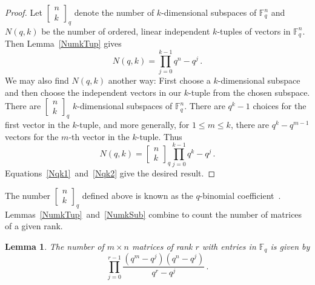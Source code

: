 \documentclass[3p,times]{elsarticle}
\newtheorem{lemma}[theorem]{Lemma}
\theoremstyle{remark}
\newcommand{\qbin}[2]{\begin{bmatrix}{#1}\\ {#2}\end{bmatrix}_q}
\newcommand{\Fq}{\mathbb{F}_q}
\newcommand\Fqn[1]{\mathbb{F}_q^{#1}}
\begin{document}
\begin{proof}
  Let $\left[\begin{smallmatrix}n\\k\end{smallmatrix}\right]_q$ denote the number of $k$-dimensional subspaces of $\Fqn{n}$
  and $N(q,k)$ be the number of ordered, linear independent $k$-tuples of
  vectors in $\Fqn{n}$.  Then Lemma~\ref{NumkTup} gives
  \begin{equation}
    \label{Nqk1}
    N(q,k) = \prod_{j=0}^{k-1} q^n-q^j \, .
  \end{equation}
  We may also find $N(q,k)$ another way: First choose a $k$-dimensional
  subspace and then choose the independent vectors in our $k$-tuple from the
  chosen subspace.  There are
  $\left[\begin{smallmatrix}n\\k\end{smallmatrix}\right]_q$ $k$-dimensional
  subspaces of $\Fqn{n}$.  There are $q^k-1$ choices for the first vector in
  the $k$-tuple, and more generally, for $1 \leq m \leq k$, there are $q^k - q^{m-1}$ vectors for
  the $m$-th vector in the $k$-tuple.  Thus
  \begin{equation}\label{Nqk2}
    N(q,k) = \qbin{n}{k}\prod_{j=0}^{k-1} q^k - q^j \, .
  \end{equation}
  Equations~\eqref{Nqk1}~and~\eqref{Nqk2} give the desired result.
\end{proof}

The number $\left[\begin{smallmatrix}n\\k\end{smallmatrix}\right]_q$ defined
above is known as the $q$-binomial
coefficient~\cite{stanley2011enumerative}.  
Lemmas~\ref{NumkTup}~and~\ref{NumkSub} combine to count the number of matrices
of a given rank. 

\begin{lemma}\label{Num_mbyn_rankr}
The number of $m\times n$ matrices of rank $r$ with entries in $\Fq$ is given by
\begin{equation*}
      \prod_{j=0}^{r-1} \frac{(q^m-q^j) (q^n - q^j)}{q^r - q^j} \, .
\end{equation*}
\end{lemma}
\end{document}
